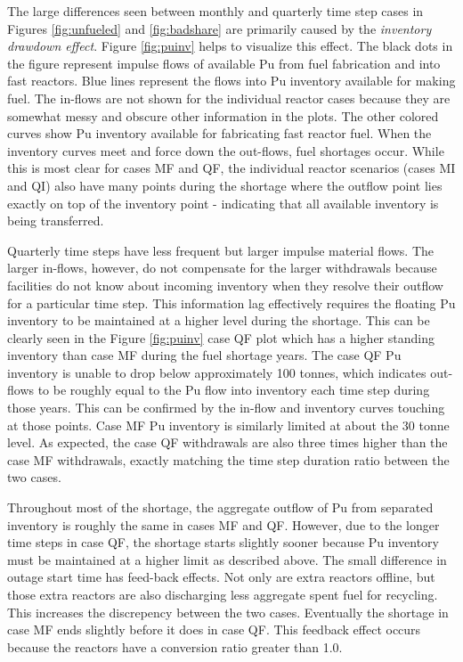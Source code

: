 \documentclass{style}
\begin{document}
The large differences seen between monthly and quarterly time step cases in
Figures \ref{fig:unfueled} and \ref{fig:badshare} are primarily caused by the
\emph{inventory drawdown effect}.  Figure \ref{fig:puinv} helps to visualize
this effect.  The black dots in the figure represent impulse flows of
available Pu from fuel fabrication and into fast reactors.  Blue lines represent
the flows into Pu inventory available for making fuel. The in-flows are not
shown for the individual reactor cases because they are somewhat messy and
obscure other information in the plots. The other colored curves show Pu inventory
available for fabricating fast reactor fuel.  When the inventory curves meet and
force down the out-flows, fuel shortages occur.  While this is most clear for
cases MF and QF, the individual reactor scenarios (cases MI and QI) also have many
points during the shortage where the outflow point lies exactly on top of the
inventory point - indicating that all available inventory is being
transferred.

Quarterly time steps have less frequent but larger impulse material flows.
The larger in-flows, however, do not compensate for the larger withdrawals
because facilities do not know about incoming inventory when they resolve
their outflow for a particular time step.  This information lag effectively
requires the floating Pu inventory to be maintained at a higher level during
the shortage.  This can be clearly seen in the Figure \ref{fig:puinv} case QF plot which has a higher
standing inventory than case MF during the fuel shortage years.  The case QF Pu
inventory is unable to drop below approximately 100 tonnes, which indicates
out-flows to be roughly equal to the Pu flow into inventory each time step
during those years.  This can be confirmed by the in-flow and inventory curves
touching at those points.  Case MF Pu inventory is similarly limited at about
the 30 tonne level.  As expected, the case QF withdrawals are also three times
higher than the case MF withdrawals, exactly matching the time step duration ratio
between the two cases.

Throughout most of the shortage, the aggregate outflow of Pu from separated
inventory is roughly the same in cases MF and QF.  However, due to the longer
time steps in case QF, the shortage starts slightly sooner because Pu inventory
must be maintained at a higher limit as described above.  The small difference
in outage start time has feed-back effects.  Not only are extra reactors
offline, but those extra reactors are also discharging less aggregate spent
fuel for recycling.  This increases the discrepency between the two
cases. Eventually the shortage in case MF ends slightly before it does in case
QF. This feedback effect occurs because the reactors have a
conversion ratio greater than 1.0.
\end{document}

